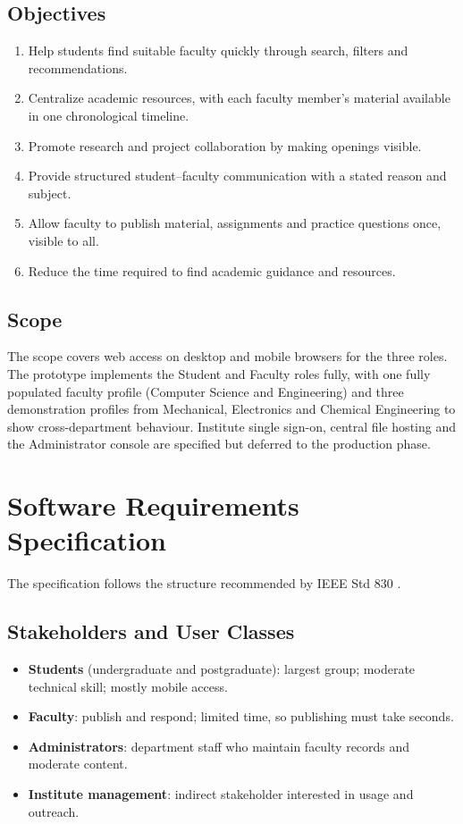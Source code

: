 \documentclass[conference]{IEEEtran}
\begin{document}
\subsection{Objectives}
\begin{enumerate}
  \item Help students find suitable faculty quickly through search, filters and recommendations.
  \item Centralize academic resources, with each faculty member's material available in one chronological timeline.
  \item Promote research and project collaboration by making openings visible.
  \item Provide structured student--faculty communication with a stated reason and subject.
  \item Allow faculty to publish material, assignments and practice questions once, visible to all.
  \item Reduce the time required to find academic guidance and resources.
\end{enumerate}

\subsection{Scope}
The scope covers web access on desktop and mobile browsers for the three roles. The prototype implements the Student and Faculty roles fully, with one fully populated faculty profile (Computer Science and Engineering) and three demonstration profiles from Mechanical, Electronics and Chemical Engineering to show cross-department behaviour. Institute single sign-on, central file hosting and the Administrator console are specified but deferred to the production phase.

\section{Software Requirements Specification}

The specification follows the structure recommended by IEEE Std 830 \cite{ieee830}.

\subsection{Stakeholders and User Classes}
\begin{itemize}
  \item \textbf{Students} (undergraduate and postgraduate): largest group; moderate technical skill; mostly mobile access.
  \item \textbf{Faculty}: publish and respond; limited time, so publishing must take seconds.
  \item \textbf{Administrators}: department staff who maintain faculty records and moderate content.
  \item \textbf{Institute management}: indirect stakeholder interested in usage and outreach.
\end{itemize}
\end{document}
